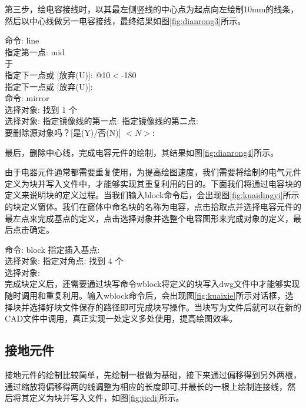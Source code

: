 第三步，绘电容接线时，以其最左侧竖线的中心点为起点向左绘制10mm的线条，然后以中心线做另一电容接线，最终结果如图\ref{fig:dianrong3}所示。

\noindent
命令: line\\
指定第一点: mid\\
于\\
指定下一点或 [放弃(U)]: @10$<$-180\\
指定下一点或 [放弃(U)]:\\
命令: mirror\\
选择对象: 找到 1 个\\
选择对象:  指定镜像线的第一点: 指定镜像线的第二点:\\
要删除源对象吗？[是(Y)/否(N)] $<N>:$

\indent
最后，删除中心线，完成电容元件的绘制，其结果如图\ref{fig:dianrong4}所示。

由于电器元件通常都需要重复使用，为提高绘图速度，我们需要将绘制的电气元件定义为块并写入文件中，才能够实现其重复利用的目的。下面我们将通过电容块的定义来说明块的定义过程。当我们输入block命令后，会出现图\ref{fig:kuaidingyi}所示的块定义窗体。我们在窗体中命名块的名称为电容，点击拾取点并选择电容元件的最左点来完成基点的定义，点击选择对象并选整个电容图形来完成对象的定义，最后点击确定。

\noindent
命令: block 指定插入基点:\\
选择对象: 指定对角点: 找到 4 个\\
选择对象:\\

\indent
完成块定义后，还需要通过块写命令wblock将定义的块写入dwg文件中才能够实现随时调用和重复利用。输入wblock命令后，会出现图\ref{fig:kuaixie}所示对话框，选择块并选择好块文件保存的路径即可完成块写操作。当块写为文件后就可以在新的CAD文件中调用，真正实现一处定义多处使用，提高绘图效率。

\noindent
\begin{figure}[htbp]
\centering
\begin{floatrow}
\end{floatrow}
\end{figure}
\indent

\subsection{接地元件}
接地元件的绘制比较简单，先绘制一根做为基础，接下来通过偏移得到另外两根，通过缩放将偏移得两的线调整为相应的长度即可,并最长的一根上绘制连接线，然后将其定义为块并写入文件，如图\ref{fig:jiedi}所示。

